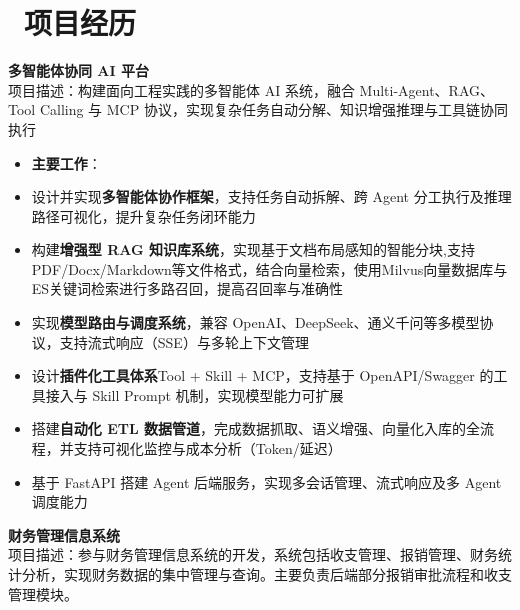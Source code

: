 \documentclass[11pt]{article}
\newlength{\interProjectSpacing}
\newcommand{\projectsep}{\vspace{\interProjectSpacing}}
\newlength{\intraProjectTitleSep}
\newcommand{\titlebreak}{\\[\intraProjectTitleSep]}
\newlength{\intraProjectListTopSep}
\begin{document}
\section{\makebox[\widthof{\faUsers}][c]{\color{CVBlue}\faUsers}\ 项目经历}
\textbf{多智能体协同 AI 平台} \titlebreak
项目描述：构建面向工程实践的多智能体 AI 系统，融合 Multi-Agent、RAG、Tool Calling 与 MCP 协议，实现复杂任务自动分解、知识增强推理与工具链协同执行
\begin{itemize}[nosep, topsep=\intraProjectListTopSep]
    \item \textbf{主要工作}：
    \item   设计并实现\textbf{多智能体协作框架}，支持任务自动拆解、跨 Agent 分工执行及推理路径可视化，提升复杂任务闭环能力
    \item   构建\textbf{增强型 RAG 知识库系统}，实现基于文档布局感知的智能分块,支持PDF/Docx/Markdown等文件格式，结合向量检索，使用Milvus向量数据库与ES关键词检索进行多路召回，提高召回率与准确性
    \item   实现\textbf{模型路由与调度系统}，兼容 OpenAI、DeepSeek、通义千问等多模型协议，支持流式响应（SSE）与多轮上下文管理
    \item   设计\textbf{插件化工具体系}Tool + Skill + MCP，支持基于 OpenAPI/Swagger 的工具接入与 Skill Prompt 机制，实现模型能力可扩展
    \item   搭建\textbf{自动化 ETL 数据管道}，完成数据抓取、语义增强、向量化入库的全流程，并支持可视化监控与成本分析（Token/延迟）
    \item   基于 FastAPI 搭建 Agent 后端服务，实现多会话管理、流式响应及多 Agent 调度能力  
\end{itemize}
\projectsep
\textbf{财务管理信息系统} \titlebreak
项目描述：参与财务管理信息系统的开发，系统包括收支管理、报销管理、财务统计分析，实现财务数据的集中管理与查询。主要负责后端部分报销审批流程和收支管理模块。
\end{document}
